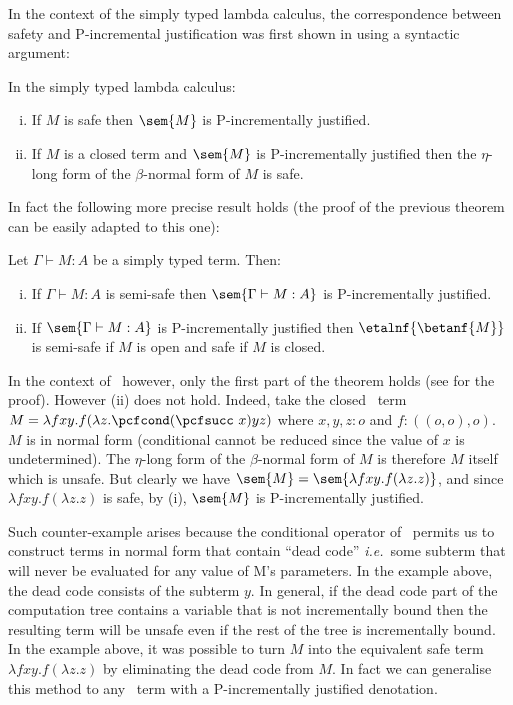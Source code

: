 In the context of the simply typed lambda calculus, the
correspondence between safety and P-incremental justification was
first shown in \cite[Theorem 3(ii)]{blumong:safelambdacalculus}
using a syntactic argument:
\begin{theorem}
\label{thm:safeincrejust}
 In the simply typed lambda calculus:
\begin{enumerate}[(i)]
\item If $M$ is safe then $\sem{M}$ is P-incrementally justified.
\item If $M$ is a closed term and $\sem{M}$ is
  P-incrementally justified then the $\eta$-long form of the
  $\beta$-normal form of $M$ is safe.
\end{enumerate}
\end{theorem}
In fact the following more precise result holds (the proof of the
previous theorem can be easily adapted to this one):
\begin{theorem}
\label{thm:semisafeincrejust} Let $\Gamma \vdash M : A$ be a simply typed term. Then:
\begin{enumerate}[(i)]
\item If $\Gamma \vdash M : A$ is semi-safe then $\sem{\Gamma \vdash M : A}$ is P-incrementally justified.
\item If $\sem{\Gamma \vdash M : A}$ is
  P-incrementally justified then $\etalnf{\betanf{M}}$ is
semi-safe if $M$ is open and safe if $M$ is closed.
\end{enumerate}
\end{theorem}



In the context of \pcf\ however, only the first part of the theorem
holds (see \cite{blumtransfer} for the proof). However (ii) does not
hold. Indeed, take the closed \pcf\ term $M = \lambda f x y. f
(\lambda z. \pcfcond (\pcfsucc\ x) y z )$ where $x,y,z:o$ and
$f:((o,o),o)$. $M$ is in normal form (conditional cannot be reduced
since the value of $x$ is undetermined). The $\eta$-long form of the
$\beta$-normal form of $M$ is therefore $M$ itself which is unsafe.
But clearly we have $\sem{M} = \sem{\lambda f x y. f (\lambda z.
z)}$, and since $\lambda f x y. f (\lambda z. z)$ is safe, by (i),
$\sem{M}$ is P-incrementally justified.

Such counter-example arises because the conditional operator of
\pcf\ permits us to construct terms in normal form that contain
``dead code'' {\it i.e.}~some subterm that will never be evaluated
for any value of M's parameters. In the example above, the dead code
consists of the subterm $y$. In general, if the dead code part of
the computation tree contains a variable that is not incrementally
bound then the resulting term will be unsafe even if the rest of the
tree is incrementally bound. In the example above, it was possible
to turn $M$ into the equivalent safe term $\lambda f x y. f (\lambda
z. z)$ by eliminating the dead code from $M$. In fact we can
generalise this method to any \pcf\ term with a P-incrementally
justified denotation.
\smallskip

